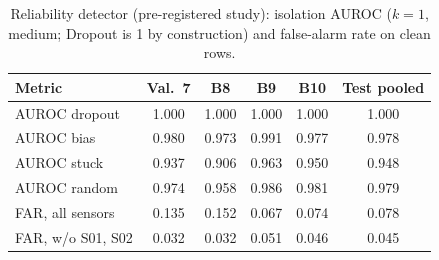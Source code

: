 \begin{table}[t]
\centering
\footnotesize
\caption{Reliability detector (pre-registered study): isolation AUROC ($k=1$, medium; Dropout is 1 by construction) and false-alarm rate on clean rows.}
\label{tab:v1det}
\setlength{\tabcolsep}{3pt}
\begin{tabular}{lccccc}
\toprule
Metric & Val.\ 7 & B8 & B9 & B10 & Test pooled \\
\midrule
AUROC dropout & 1.000 & 1.000 & 1.000 & 1.000 & 1.000 \\
AUROC bias & 0.980 & 0.973 & 0.991 & 0.977 & 0.978 \\
AUROC stuck & 0.937 & 0.906 & 0.963 & 0.950 & 0.948 \\
AUROC random & 0.974 & 0.958 & 0.986 & 0.981 & 0.979 \\
FAR, all sensors & 0.135 & 0.152 & 0.067 & 0.074 & 0.078 \\
FAR, w/o S01, S02 & 0.032 & 0.032 & 0.051 & 0.046 & 0.045 \\
\bottomrule
\end{tabular}
\end{table}
